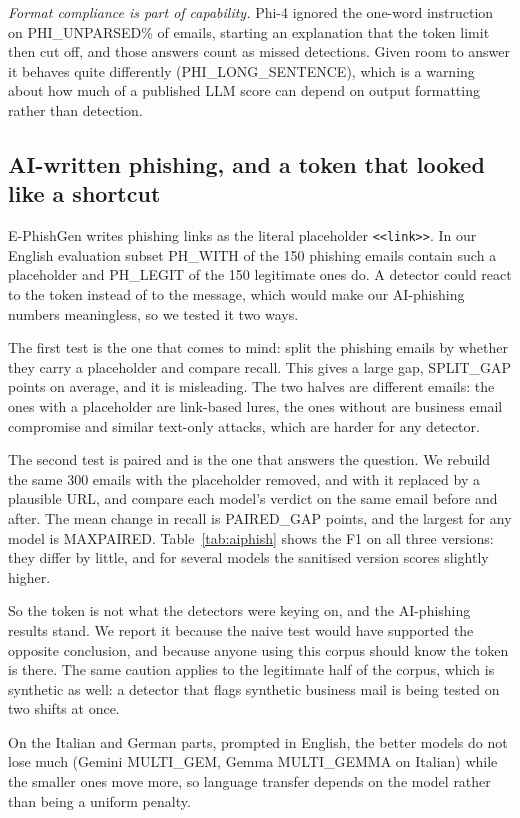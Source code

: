 \textit{Format compliance is part of capability.} Phi-4 ignored the one-word
instruction on PHI_UNPARSED\% of emails, starting an explanation that the token
limit then cut off, and those answers count as missed detections. Given room to
answer it behaves quite differently (PHI_LONG_SENTENCE), which is a warning
about how much of a published LLM score can depend on output formatting rather
than detection.

\subsection{AI-written phishing, and a token that looked like a shortcut}

E-PhishGen writes phishing links as the literal placeholder
\texttt{<<link>>}. In our English evaluation subset PH_WITH of the 150 phishing
emails contain such a placeholder and PH_LEGIT of the 150 legitimate ones do. A
detector could react to the token instead of to the message, which would make
our AI-phishing numbers meaningless, so we tested it two ways.

The first test is the one that comes to mind: split the phishing emails by
whether they carry a placeholder and compare recall. This gives a large gap,
SPLIT_GAP points on average, and it is misleading. The two halves are different
emails: the ones with a placeholder are link-based lures, the ones without are
business email compromise and similar text-only attacks, which are harder for
any detector.

The second test is paired and is the one that answers the question. We rebuild
the same 300 emails with the placeholder removed, and with it replaced by a
plausible URL, and compare each model's verdict on the same email before and
after. The mean change in recall is PAIRED_GAP points, and the largest for any
model is MAXPAIRED. Table~\ref{tab:aiphish} shows the F1 on all three versions:
they differ by little, and for several models the sanitised version scores
slightly higher.

So the token is not what the detectors were keying on, and the AI-phishing
results stand. We report it because the naive test would have supported the
opposite conclusion, and because anyone using this corpus should know the
token is there. The same caution applies to the legitimate half of the corpus,
which is synthetic as well: a detector that flags synthetic business mail is
being tested on two shifts at once.

On the Italian and German parts, prompted in English, the better models do not
lose much (Gemini MULTI_GEM, Gemma MULTI_GEMMA on Italian) while the smaller
ones move more, so language transfer depends on the model rather than being a
uniform penalty.

